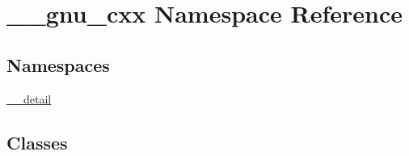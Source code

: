 \hypertarget{namespace____gnu__cxx}{}\section{\+\_\+\+\_\+gnu\+\_\+cxx Namespace Reference}
\label{namespace____gnu__cxx}
\subsection*{Namespaces}
\begin{DoxyCompactItemize}
\item 
 \hyperlink{namespace____gnu__cxx_1_1____detail}{\+\_\+\+\_\+detail}
\end{DoxyCompactItemize}
\subsection*{Classes}
